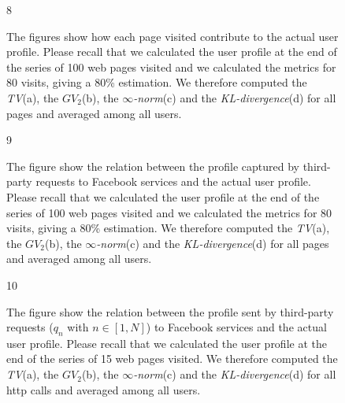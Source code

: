\begin{figure}{8}
\begin{center}
%
%


%
%
\caption{\label{average-pop-profiles} The figures show how each page visited contribute to the actual user profile. Please recall that we calculated the user profile at the end of the series of 100 web pages visited and we calculated the metrics for 80 visits, giving a 80\% estimation. %
We therefore computed the \emph{TV}(a), the \emph{$GV_2$}(b), the \emph{$\infty$-norm}(c) and the \emph{KL-divergence}(d) for all pages and averaged among all users.}%
\end{center}
\end{figure}

\begin{figure}{9}
\begin{center}
%
%


%
%
\caption{\label{average-facebook-pages-tracker} The figure show the relation between the profile captured by third-party requests to Facebook services and the actual user profile. Please recall that we calculated the user profile at the end of the series of 100 web pages visited and we calculated the metrics for 80 visits, giving a 80\% estimation.%
We therefore computed the \emph{TV}(a), the \emph{$GV_2$}(b), the \emph{$\infty$-norm}(c) and the \emph{KL-divergence}(d) for all pages and averaged among all users.}%
\end{center}
\end{figure}

\begin{figure}{10}
\begin{center}
%
%


%
%
\caption{\label{average-facebook-tags-tracker} The figure show the relation between the profile sent by third-party requests ($q_n$ with $n \in [1, N]$) to Facebook services and the actual user profile. Please recall that we calculated the user profile at the end of the series of 15 web pages visited. %
We therefore computed the \emph{TV}(a), the \emph{$GV_2$}(b), the \emph{$\infty$-norm}(c) and the \emph{KL-divergence}(d) for all http calls and averaged among all users.}%
\end{center}
\end{figure}

